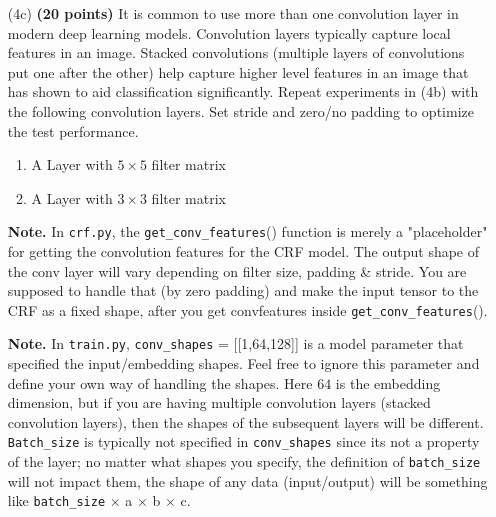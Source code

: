 \documentclass[11pt]{report}
\begin{document}
\begin{itemize}
{\bf Note.} You have to make sure that invalid letters do not add any value to your loss function. Moreover, while you are calculating the gradient, you have zero-out the gradients of invalid letters. You cannot just use the true labels to find valid letters because, in test time, the labels are not provided to the model. The solution was to use the input image and find valid images (any image with at least one non-zero pixel). You can use 'torch.any()' and 'torch.where()' for masking and filtering.

  

\item [(4c)] {\bf (20 points)} It is common to use more than one convolution
  layer in modern deep learning models. Convolution layers typically capture
  local features in an image. Stacked convolutions (multiple layers of
  convolutions put one after the other) help capture higher level features in an
  image that has shown to aid classification significantly. Repeat experiments
  in (4b) with the following convolution layers. Set stride and zero/no padding
  to optimize the test performance.


\begin{enumerate}
	\item A Layer with \(5 \times 5\) filter matrix
	\item A Layer with \(3 \times 3\) filter matrix
\end{enumerate}

{\bf Note.} In \verb#crf.py#, the \verb#get_conv_features#() function is merely a "placeholder" for getting the convolution features for the CRF model. The output shape of the conv layer will vary depending on filter size, padding \& stride. You are supposed to handle that (by zero padding) and make the input tensor to the CRF as a fixed shape, after you get convfeatures inside \verb#get_conv_features#().

{\bf Note.} In \verb#train.py#, \verb#conv_shapes# = [[1,64,128]] is a model parameter that specified the input/embedding shapes. Feel free to ignore this parameter and define your own way of handling the shapes. Here $64$ is the embedding dimension, but if you are having multiple convolution layers (stacked convolution layers), then the shapes of the subsequent layers will be different. \verb#Batch_size# is typically not specified in \verb#conv_shapes# since its not a property of the layer; no matter what shapes you specify, the definition of \verb#batch_size# will not impact them, the shape of any data (input/output) will be something like \verb#batch_size# $\times$ a $\times$ b $\times$ c.



\end{itemize}
\end{document}
